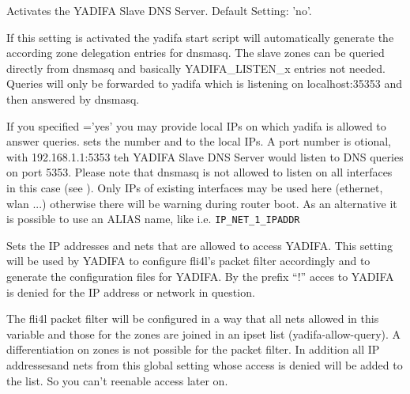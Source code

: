 \begin{description}


    Activates the YADIFA Slave DNS Server. Default Setting: 'no'.


    If this setting is activated the yadifa start script will automatically
    generate the according zone delegation entries for dnsmasq. The slave
    zones can be queried directly from dnsmasq and basically
    YADIFA\_LISTEN\_x entries not needed. Queries will only be forwarded
    to yadifa which is listening on localhost:35353 and then answered by dnsmasq.


    If you specified ='yes' you may provide local IPs
    on which yadifa is allowed to answer queries. 
    sets the number and  to 
    the local IPs. A port number is otional, with 192.168.1.1:5353
    teh YADIFA Slave DNS Server would listen to DNS queries on port 5353.
    Please note that dnsmasq is not allowed to listen on all interfaces in
    this case (see ). Only IPs of existing interfaces
    may be used here (ethernet, wlan ...) otherwise there will be warning
    during router boot. As an alternative it is possible to use an ALIAS name,
    like i.e. \verb+IP_NET_1_IPADDR+


    Sets the IP addresses and nets that are allowed to access YADIFA.
    This setting will be used by YADIFA to configure fli4l's packet filter
    accordingly and to generate the configuration files for YADIFA. By the prefix
    ``!'' acces to YADIFA is denied for the IP address or network in question.

    The fli4l packet filter will be configured in a way that all nets allowed
    in this variable and those for the zones are joined in an ipset list
    (yadifa-allow-query). A differentiation on zones is not possible for the
    packet filter. In addition all IP addressesand nets from this global setting
    whose access is denied will be added to the list. So you can't reenable
    access later on.


\end{description}
